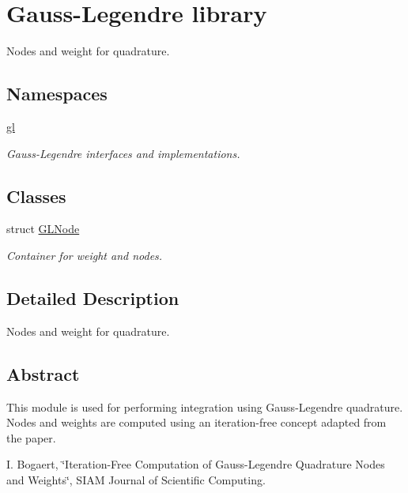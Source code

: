 \hypertarget{group__GL}{\section{Gauss-\/\+Legendre library}
\label{group__GL}
}


Nodes and weight for quadrature.  


\subsection*{Namespaces}
\begin{DoxyCompactItemize}
\item 
 \hyperlink{namespacegl}{gl}
\begin{DoxyCompactList}\small\item\em Gauss-\/\+Legendre interfaces and implementations. \end{DoxyCompactList}\end{DoxyCompactItemize}
\subsection*{Classes}
\begin{DoxyCompactItemize}
\item 
struct \hyperlink{structgl_1_1GLNode}{G\+L\+Node}
\begin{DoxyCompactList}\small\item\em Container for weight and nodes. \end{DoxyCompactList}\end{DoxyCompactItemize}


\subsection{Detailed Description}
Nodes and weight for quadrature. 

\hypertarget{group__GL_gl_abstract}{}\subsection{Abstract}\label{group__GL_gl_abstract}
This module is used for performing integration using Gauss-\/\+Legendre quadrature. Nodes and weights are computed using an iteration-\/free concept adapted from the paper.

I. Bogaert, \char`\"{}\+Iteration-\/\+Free Computation of Gauss-\/\+Legendre Quadrature Nodes and Weights\char`\"{}, S\+I\+A\+M Journal of Scientific Computing.

